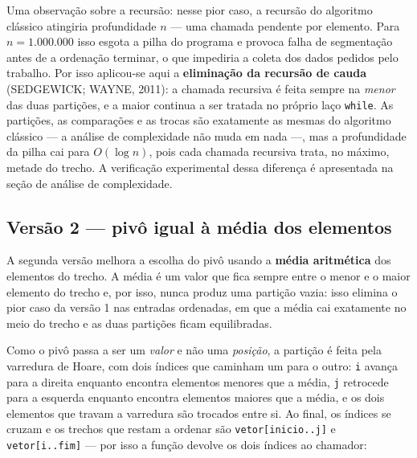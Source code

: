 \qquad Uma observação sobre a recursão: nesse pior caso, a recursão do
algoritmo clássico atingiria profundidade $n$ --- uma chamada
pendente por elemento. Para $n = 1.000.000$ isso esgota a pilha do
programa e provoca falha de segmentação antes de a ordenação
terminar, o que impediria a coleta dos dados pedidos pelo trabalho.
Por isso aplicou-se aqui a \textbf{eliminação da recursão de cauda}
(SEDGEWICK; WAYNE, 2011): a chamada recursiva é feita sempre na
\textit{menor} das duas partições, e a maior continua a ser tratada
no próprio laço \texttt{while}. As partições, as comparações e as
trocas são exatamente as mesmas do algoritmo clássico --- a análise
de complexidade não muda em nada ---, mas a profundidade da pilha cai
para $O(\log n)$, pois cada chamada recursiva trata, no máximo,
metade do trecho. A verificação experimental dessa diferença é
apresentada na seção de análise de complexidade.

\subsection{Versão 2 --- pivô igual à média dos elementos}

\qquad A segunda versão melhora a escolha do pivô usando a
\textbf{média aritmética} dos elementos do trecho. A média é um valor
que fica sempre entre o menor e o maior elemento do trecho e, por
isso, nunca produz uma partição vazia: isso elimina o pior caso da
versão 1 nas entradas ordenadas, em que a média cai exatamente no
meio do trecho e as duas partições ficam equilibradas.

\qquad Como o pivô passa a ser um \textit{valor} e não uma
\textit{posição}, a partição é feita pela varredura de Hoare, com dois
índices que caminham um para o outro: \texttt{i} avança para a direita
enquanto encontra elementos menores que a média, \texttt{j} retrocede
para a esquerda enquanto encontra elementos maiores que a média, e os
dois elementos que travam a varredura são trocados entre si. Ao final,
os índices se cruzam e os trechos que restam a ordenar são
\texttt{vetor[inicio..j]} e \texttt{vetor[i..fim]} --- por isso a
função devolve os dois índices ao chamador:

